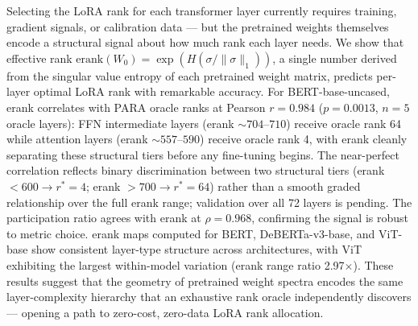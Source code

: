 Selecting the LoRA rank for each transformer layer currently requires training, gradient signals, or calibration data --- but the pretrained weights themselves encode a structural signal about how much rank each layer needs. We show that effective rank $\text{erank}(W_0) = \exp(H(\sigma/\|\sigma\|_1))$, a single number derived from the singular value entropy of each pretrained weight matrix, predicts per-layer optimal LoRA rank with remarkable accuracy. For BERT-base-uncased, erank correlates with PARA oracle ranks at Pearson $r = 0.984$ ($p = 0.0013$, $n=5$ oracle layers): FFN intermediate layers (erank $\sim 704$--$710$) receive oracle rank 64 while attention layers (erank $\sim 557$--$590$) receive oracle rank 4, with erank cleanly separating these structural tiers before any fine-tuning begins. The near-perfect correlation reflects binary discrimination between two structural tiers (erank $< 600 \to r^*=4$; erank $> 700 \to r^*=64$) rather than a smooth graded relationship over the full erank range; validation over all 72 layers is pending. The participation ratio agrees with erank at $\rho = 0.968$, confirming the signal is robust to metric choice. erank maps computed for BERT, DeBERTa-v3-base, and ViT-base show consistent layer-type structure across architectures, with ViT exhibiting the largest within-model variation (erank range ratio 2.97$\times$). These results suggest that the geometry of pretrained weight spectra encodes the same layer-complexity hierarchy that an exhaustive rank oracle independently discovers --- opening a path to zero-cost, zero-data LoRA rank allocation.
